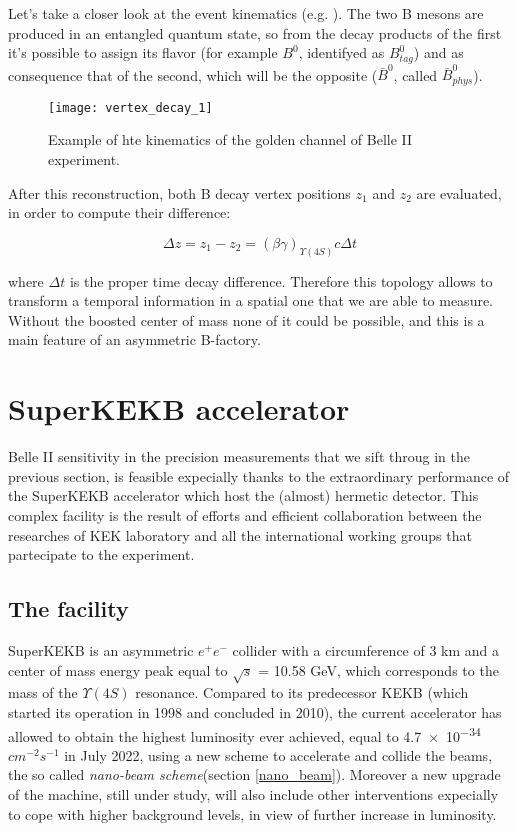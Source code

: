 Let's take a closer look at the event kinematics (e.g. ). The two B mesons are produced in an entangled quantum state, so from the decay products of the first it's possible to assign its flavor (for example $B^{0}$, identifyed as $B_{tag}^{0}$) and as consequence that of the second, which will be the opposite ($\bar{B}^{0}$, called $\bar{B}_{phys}^{0}$).

\begin{figure}[h!]
\centering
\texttt{[image: vertex\_decay\_1]}
\caption{Example of hte kinematics of the golden channel of Belle II experiment.}
\label{fig:decay_vertex}
\end{figure}

After this reconstruction, both B decay vertex positions $\textit{z}_{1}$ and $\textit{z}_{2}$ are evaluated, in order to compute their difference:

\begin{equation}
\Delta \textit{z} = \textit{z}_{1} - \textit{z}_{2} = (\beta\gamma)_{\Upsilon(4S)}c\Delta t
\end{equation}

where $\Delta t$ is the proper time decay difference. Therefore this topology allows to transform a temporal information in a spatial one that we are able to measure. Without the boosted center of mass none of it could be possible, and this is a main feature of an asymmetric B-factory.



\section{SuperKEKB accelerator}

Belle II sensitivity in the precision measurements that we sift throug in the previous section, is feasible expecially thanks to the extraordinary performance of the SuperKEKB accelerator which host the (almost) hermetic detector. This complex facility is the result of efforts and efficient collaboration between the researches of KEK laboratory and all the international working groups that partecipate to the experiment.


\subsection{The facility}

SuperKEKB is an asymmetric $e^{+}e^{-}$ collider with a circumference of 3 km and a center of mass energy peak equal to  $\sqrt{s}$ = 10.58 GeV, which corresponds to the mass of the $\Upsilon(4S)$ resonance.
Compared to its predecessor KEKB (which started its operation in 1998 and concluded in 2010), the current accelerator has allowed to obtain the highest luminosity ever achieved, equal to \num{4.7e-34} $cm^{-2}s^{-1}$ in July 2022, using a new scheme to accelerate and collide the beams, the so called \textit{nano-beam scheme}(section \vref{nano_beam}). Moreover a new upgrade of the machine, still under study, will also include other interventions expecially to cope with higher background levels, in view of further increase in luminosity.

